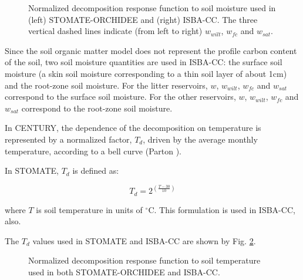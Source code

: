 {%
\begin{figure}[h]
\begin{center}
\caption{Normalized decomposition response function to soil moisture 
       used in (left) STOMATE-ORCHIDEE and (right) ISBA-CC.
	 The three vertical dashed lines indicate (from left to right) $w_{wilt}$, 
	 $w_{fc}$ and $w_{sat}$.}
\label{fig_moist}
\end{center}
\end{figure}


Since the soil organic matter model does not represent the profile
carbon content of the soil, two soil moisture quantities are used in ISBA-CC: 
the surface soil moisture (a skin soil moisture corresponding to a thin soil layer of about 1cm) 
and the root-zone soil moisture. 
For the litter reservoirs, $w$,
$w_{wilt}$, $w_{fc}$ and $w_{sat}$ correspond to the surface soil moisture.
For the other reservoirs, $w$, $w_{wilt}$, $w_{fc}$ and $w_{sat}$ correspond to the root-zone soil moisture.


In CENTURY, the dependence of the decomposition on temperature is represented by a normalized factor, $T_d$,
driven by the average monthly temperature, according to a bell curve (Parton ).

In STOMATE, $T_d$ is defined as:

\begin{equation}
T_d = 2 ^ {(\frac{T-30}{10})}
\end{equation}

where $T$ is soil temperature in units of $^{\circ}$C.
This formulation is used in ISBA-CC, also.

The $T_d$ values used in STOMATE and ISBA-CC are shown by Fig. \ref{fig_temp}.


\begin{figure}[h]
\begin{center}
\caption{Normalized decomposition response function to soil temperature 
         used in both STOMATE-ORCHIDEE and ISBA-CC.}
\label{fig_temp}
\end{center}
\end{figure}


}
